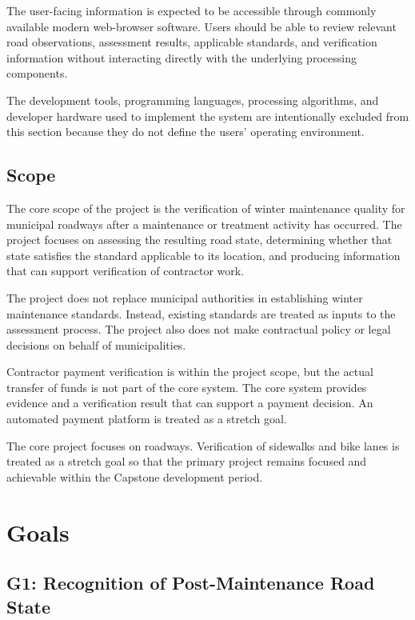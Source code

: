 \documentclass{article}
\begin{document}
The user-facing information is expected to be accessible through commonly
available modern web-browser software. Users should be able to review relevant
road observations, assessment results, applicable standards, and verification
information without interacting directly with the underlying processing
components.

The development tools, programming languages, processing algorithms, and
developer hardware used to implement the system are intentionally excluded
from this section because they do not define the users' operating environment.

\subsection{Scope}

The core scope of the project is the verification of winter maintenance quality
for municipal roadways after a maintenance or treatment activity has occurred.
The project focuses on assessing the resulting road state, determining whether
that state satisfies the standard applicable to its location, and producing
information that can support verification of contractor work.

The project does not replace municipal authorities in establishing winter
maintenance standards. Instead, existing standards are treated as inputs to the
assessment process. The project also does not make contractual policy or legal
decisions on behalf of municipalities.

Contractor payment verification is within the project scope, but the actual
transfer of funds is not part of the core system. The core system provides
evidence and a verification result that can support a payment decision. An
automated payment platform is treated as a stretch goal.

The core project focuses on roadways. Verification of sidewalks and bike lanes
is treated as a stretch goal so that the primary project remains focused and
achievable within the Capstone development period.

\section{Goals}

\subsection{G1: Recognition of Post-Maintenance Road State}
\end{document}
